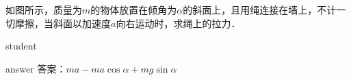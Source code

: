 \begin{example}
	如图所示，质量为$ m $的物体放置在倾角为$ \alpha $的斜面上，且用绳连接在墙上，不计一切摩擦，当斜面以加速度$ a $向右运动时，求绳上的拉力．
	
	\begin{taggedblock}{student}
		\vspace*{2cm}
	\end{taggedblock}
	
	
	\begin{taggedblock}{answer}
		答案：$ ma-ma\cos\alpha+mg\sin\alpha $
	\end{taggedblock}
	

\end{example}
